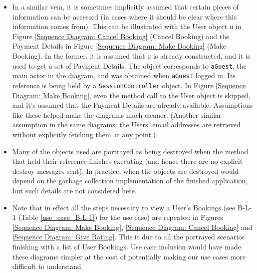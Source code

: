 \begin{itemize}
    \item In a similar vein, it is sometimes implicitly assumed that certain pieces of information can be accessed (in cases where it should be clear where this information comes from). This can be illustrated with the User object \texttt{u} in Figure \ref{Sequence Diagram: Cancel Booking} (Cancel Booking) and the Payment Details in Figure \ref{Sequence Diagram: Make Booking} (Make Booking). In the former, it is assumed that \texttt{u} is already constructed, and it is used to get a set of Payment Details. The object corresponds to \texttt{aGuest}, the main actor in the diagram, and was obtained when \texttt{aGuest} logged in. Its reference is being held by a \texttt{SessionController} object. In Figure \ref{Sequence Diagram: Make Booking}, even the method call to the User object is skipped, and it's assumed that the Payment Details are already available. Assumptions like these helped make the diagrams much cleaner. (Another similar assumption in the same diagrams: the Users' email addresses are retrieved without explicitly fetching them at any point.)
    \item Many of the objects used are portrayed as being destroyed when the method that held their reference finishes executing (and hence there are no explicit destroy messages sent). In practice, when the objects are destroyed would depend on the garbage collection implementation of the finished application, but such details are not considered here.
    \item Note that in effect all the steps necessary to view a User's Bookings (see B-L-1 (Table \ref{use_case_B-L-1}) for the use case) are repeated in Figures \ref{Sequence Diagram: Make Booking}, \ref{Sequence Diagram: Cancel Booking} and \ref{Sequence Diagram: Give Rating}. This is due to all the portrayed scenarios finishing with a list of User Bookings. Use case inclusion would have made these diagrams simpler at the cost of potentially making our use cases more difficult to understand. 
\end{itemize}

